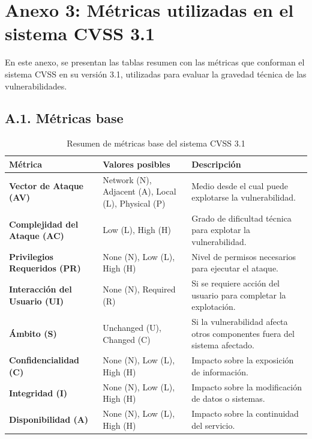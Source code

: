 \documentclass[a4paper, 11pt]{article}
\begin{document}
\clearpage
\thispagestyle{nohead}

\section*{Anexo 3: Métricas utilizadas en el sistema CVSS 3.1}
\label{anexo:3}


En este anexo, se presentan las tablas resumen con las métricas que conforman el sistema CVSS en su versión 3.1, utilizadas para evaluar la gravedad técnica de las vulnerabilidades.

\vspace{0.5cm}

\subsection*{A.1. Métricas base}

\begin{table}[H]
\centering
\caption{Resumen de métricas base del sistema CVSS 3.1}
\label{tab:cvss_base_metrics}
\begin{tabular}{|p{4.5cm}|p{3.5cm}|p{7cm}|}
\hline
\rowcolor{gray!30}
\textbf{Métrica} & \textbf{Valores posibles} & \textbf{Descripción} \\ \hline
\textbf{Vector de Ataque (AV)} & Network (N), Adjacent (A), Local (L), Physical (P) & Medio desde el cual puede explotarse la vulnerabilidad. \\ \hline
\textbf{Complejidad del Ataque (AC)} & Low (L), High (H) & Grado de dificultad técnica para explotar la vulnerabilidad. \\ \hline
\textbf{Privilegios Requeridos (PR)} & None (N), Low (L), High (H) & Nivel de permisos necesarios para ejecutar el ataque. \\ \hline
\textbf{Interacción del Usuario (UI)} & None (N), Required (R) & Si se requiere acción del usuario para completar la explotación. \\ \hline
\textbf{Ámbito (S)} & Unchanged (U), Changed (C) & Si la vulnerabilidad afecta otros componentes fuera del sistema afectado. \\ \hline
\textbf{Confidencialidad (C)} & None (N), Low (L), High (H) & Impacto sobre la exposición de información. \\ \hline
\textbf{Integridad (I)} & None (N), Low (L), High (H) & Impacto sobre la modificación de datos o sistemas. \\ \hline
\textbf{Disponibilidad (A)} & None (N), Low (L), High (H) & Impacto sobre la continuidad del servicio. \\ \hline
\end{tabular}
\end{table}
\end{document}
